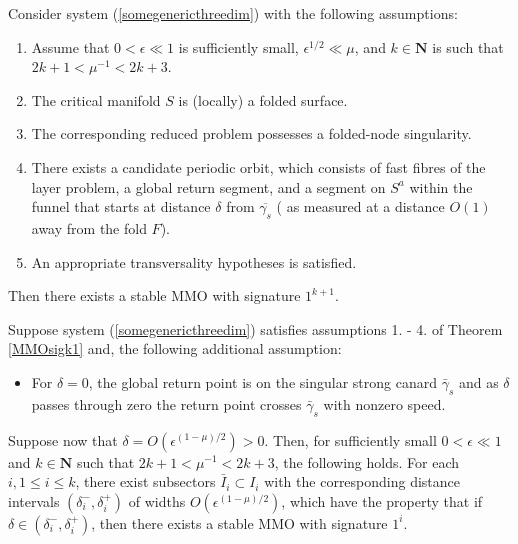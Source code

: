 \begin{theorem} \label{MMOsigk1}
Consider system (\ref{somegenericthreedim}) with the following assumptions:
\begin{enumerate}
\item Assume that $ 0 < \epsilon \ll 1$ is sufficiently small, $\epsilon^{1/2} \ll \mu$, and $k \in \mathbf{N}$ is such that $2k + 1 < \mu^{-1} < 2k + 3$.
\item The critical manifold $S$ is (locally) a folded surface.
\item The corresponding reduced problem possesses a folded-node singularity.
\item There exists a candidate periodic orbit, which consists of fast fibres of the layer problem, a global return segment, and a segment on $S^a$ within the funnel that starts at distance $\delta$ from $\overline{\gamma_s}$ ( as measured at a distance $O(1)$ away from the fold $F$).
\item An appropriate transversality hypotheses is satisfied.
\end{enumerate}
Then there exists a stable MMO with signature $1^{k+1}$.
\end{theorem}

\begin{theorem} \label{theoremsigni}
Suppose system (\ref{somegenericthreedim}) satisfies assumptions 1. - 4. of Theorem \ref{MMOsigk1} and, the following additional assumption:
\begin{itemize}
\item For $\delta = 0$, the global return point is on the singular strong canard $\bar{\gamma}_s$ and as $\delta$ passes through zero the return point crosses $\bar{\gamma}_s$ with nonzero speed.
\end{itemize}
Suppose now that $\delta= O(\epsilon ^{(1-\mu)/2})>0$. Then, for sufficiently small $0 < \epsilon \ll 1$ and $k \in \mathbf{N}$ such that $2k+1 < \mu^{-1} < 2k+ 3$, the following holds.
For each $i, 1 \leq i \leq k$, there exist subsectors $\bar{I}_i \subset I_i$ with the corresponding distance intervals $(\delta_i^-, \delta_i^+)$ of widths $O(\epsilon^{(1-\mu)/2})$, which have the property that if $\delta \in (\delta_i^-, \delta_i^+)$, then there exists a stable MMO with signature $1^i$.
\end{theorem}


